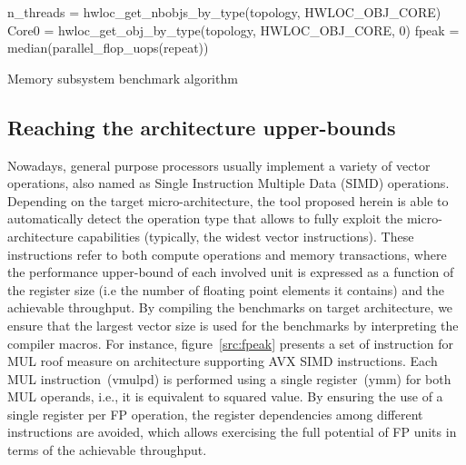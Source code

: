 \documentclass[twoside,twocolumn,9pt]{extarticle}
\begin{document}
\begin{algorithm}
 n\_threads = hwloc\_get\_nbobjs\_by\_type(topology, HWLOC\_OBJ\_CORE)\;
 Core0 = hwloc\_get\_obj\_by\_type(topology, HWLOC\_OBJ\_CORE, 0)\;
 fpeak = median(parallel\_flop\_uops(repeat))\;
 \caption{Memory subsystem benchmark algorithm}
 \label{alg:benchmarks}
\end{algorithm}


\subsection{Reaching the architecture upper-bounds}
\label{sub:arch_bounds}

Nowadays, general purpose processors usually implement a variety of vector operations, also named as Single Instruction Multiple
Data (SIMD) operations. Depending on the target micro-architecture,  the tool proposed herein is able to automatically detect the
operation type that allows to fully exploit the micro-architecture capabilities  (typically, the widest vector instructions). These
instructions refer to both compute operations and memory transactions, where the performance upper-bound of each involved unit is
expressed as a function of the register size (i.e the number of floating point  elements it contains) and the achievable
throughput. By compiling the benchmarks on target architecture, we ensure that the largest vector size is used for the benchmarks
by interpreting the compiler macros.
For instance, figure~\ref{src:fpeak} presents a set of instruction for MUL roof measure on architecture supporting AVX SIMD
instructions. Each MUL instruction~(vmulpd) is performed using a single register~(ymm) for both MUL operands, i.e., it is equivalent
to squared value. By ensuring the use of a single register per FP operation, the register dependencies among different instructions
are avoided, which allows exercising the full potential of FP units in terms of the achievable throughput.
\end{document}
